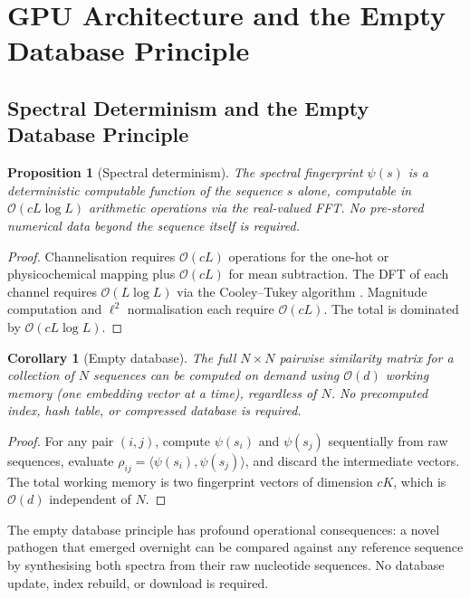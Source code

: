 \documentclass[twocolumn,11pt,a4paper]{article}
\newtheorem{proposition}[theorem]{Proposition}
\newtheorem{corollary}[theorem]{Corollary}
\theoremstyle{definition}
\theoremstyle{remark}
\newcommand{\bigO}{\mathcal{O}}
\begin{document}
\section{GPU Architecture and the Empty Database Principle}
\label{sec:gpu}

\subsection{Spectral Determinism and the Empty Database Principle}

\begin{proposition}[Spectral determinism]
\label{prop:determinism}
The spectral fingerprint $\psi(s)$ is a deterministic computable function of
the sequence $s$ alone, computable in $\bigO(c L \log L)$ arithmetic operations
via the real-valued FFT. No pre-stored numerical data beyond the sequence itself
is required.
\end{proposition}

\begin{proof}
Channelisation requires $\bigO(cL)$ operations for the one-hot or
physicochemical mapping plus $\bigO(cL)$ for mean subtraction. The DFT of each
channel requires $\bigO(L \log L)$ via the Cooley--Tukey algorithm
\citep{oppenheim2009}. Magnitude computation and $\ell^2$ normalisation each
require $\bigO(cL)$. The total is dominated by $\bigO(cL\log L)$.
\end{proof}

\begin{corollary}[Empty database]
\label{cor:empty_db}
The full $N \times N$ pairwise similarity matrix for a collection of $N$
sequences can be computed on demand using $\bigO(d)$ working memory (one
embedding vector at a time), regardless of $N$. No precomputed index, hash
table, or compressed database is required.
\end{corollary}

\begin{proof}
For any pair $(i, j)$, compute $\psi(s_i)$ and $\psi(s_j)$ sequentially from
raw sequences, evaluate $\rho_{ij} = \langle \psi(s_i), \psi(s_j) \rangle$,
and discard the intermediate vectors. The total working memory is two fingerprint
vectors of dimension $cK$, which is $\bigO(d)$ independent of $N$.
\end{proof}

The empty database principle has profound operational consequences: a novel
pathogen that emerged overnight can be compared against any reference sequence
by synthesising both spectra from their raw nucleotide sequences. No database
update, index rebuild, or download is required.
\end{document}
